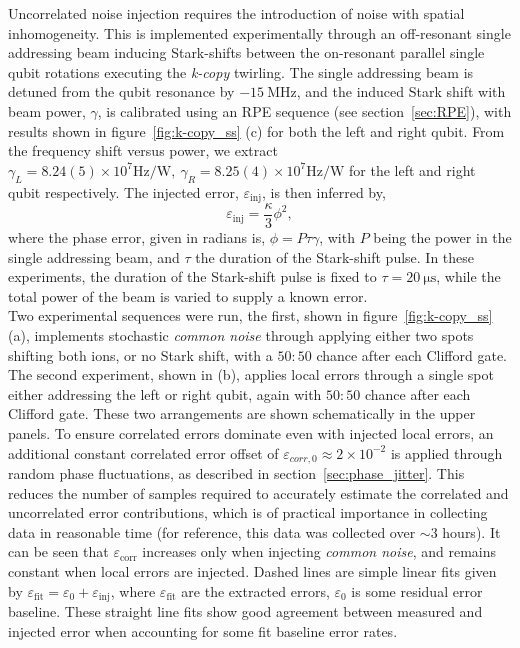 Uncorrelated noise injection requires the introduction of noise with
spatial inhomogeneity. This is implemented experimentally through an
off-resonant single addressing beam inducing Stark-shifts between the
on-resonant parallel single qubit rotations executing the \emph{k-copy}
twirling. The single addressing beam is detuned from the
qubit resonance by $-15~\unit{\mega\hertz}$, and the induced Stark shift with beam power, $\gamma$, is calibrated using an RPE sequence (see section~\ref{sec:RPE}), with results shown in figure~\ref{fig:k-copy_ss} (c) for both the left and right qubit.
From the frequency shift versus power, we extract $\gamma_L=8.24(5)\times10^7 \unit{\hertz\per\watt},~\gamma_R=8.25(4)\times10^7 \unit{\hertz\per\watt}$ for the left and right qubit respectively.
The injected error,
$\varepsilon_\mathrm{inj}$, is then inferred by,
\begin{equation}
    \varepsilon_\mathrm{inj} = \frac{\kappa}{3}\phi^2,
\end{equation}
where the phase error, given in radians is,
$\phi = P\tau\gamma$, with $P$ being the power in the single addressing beam, and $\tau$ the duration of the Stark-shift pulse. 
In these experiments, the duration of the Stark-shift pulse is fixed to $\tau=20~\unit{\micro\second}$, while the total power of the beam is varied to supply a known error.\\
Two experimental sequences were run, the first, shown
in figure~\ref{fig:k-copy_ss}(a), implements stochastic \textit{common noise} through
applying either two spots shifting both ions, or no Stark shift, with a $50:50$
chance after each Clifford gate. The second experiment, shown in (b), applies
local errors through a single spot either addressing the left or right qubit,
again with $50:50$ chance after each Clifford gate. These two arrangements are
shown schematically in the upper panels. 
To ensure correlated errors dominate even with injected local errors, an
additional constant correlated error offset of $\varepsilon_{corr,0}\approx 2\times10^{-2}$ is applied through random phase
fluctuations, as described in section~\ref{sec:phase_jitter}. This reduces the number
of samples required to accurately estimate the correlated and uncorrelated error
contributions, which is of practical importance in collecting data in reasonable
time (for reference, this data was collected over $\sim 3$ hours). 
It can be
seen that $\varepsilon_\textrm{corr}$ increases only when injecting
\textit{common noise}, and remains constant when local errors are injected.
Dashed lines are simple linear fits given by
$\varepsilon_\mathrm{fit}=\varepsilon_0+\varepsilon_\mathrm{inj}$, where
$\varepsilon_\mathrm{fit}$ are the extracted errors, $\varepsilon_0$ is some
residual error baseline. These straight line fits show good agreement between measured and injected error when accounting for some fit baseline error rates.

